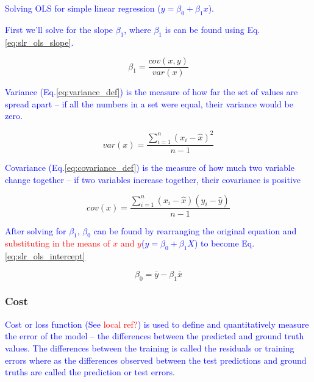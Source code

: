 \textcolor{blue}{Solving OLS for simple linear regression ($y=\beta_0 + \beta_1 x$).}

\textcolor{blue}{First we'll solve for the slope $\beta_1$, where $\beta_1$ is can be found using Eq.\ref{eq:slr_ols_slope}.}

\begin{equation}
{\beta_1 =  \frac{cov(x,y)}{var(x)}}
\label{eq:slr_ols_slope}
\end{equation}


\textcolor{blue}{Variance (Eq.\ref{eq:variance_def}) is the measure of how far the set of values are spread apart -- if all the numbers in a set were equal, their variance would be zero.}

\begin{equation}
{var(x) = \frac{\sum_{i=1}^{n}(x_i - \hat{x})^2}{n-1}}
\label{eq:variance_def}
\end{equation}


\textcolor{blue}{Covariance (Eq.\ref{eq:covariance_def}) is the measure of how much two variable change together -- if two variables increase together, their covariance is positive}

\begin{equation}
{cov(x) = \frac{\sum_{i=1}^{n}(x_i - \hat{x})(y_i - \hat{y})}{n-1}}
\label{eq:covariance_def}
\end{equation}

\textcolor{blue}{After solving for $\beta_1$, $\beta_0$ can be found by rearranging the original equation and \textcolor{red}{substituting in the means of $x$ and $y$}($y=\beta_0 + \beta_1 X$) to become Eq.\ref{eq:slr_ols_intercept}}

\begin{equation}
{\beta_0 =  \bar{y} - \beta_1 \bar{x}}
\label{eq:slr_ols_intercept}
\end{equation}

\subsubsection{Cost}

\textcolor{blue}{Cost or loss function (See \textcolor{red}{local ref?}) is used to define and quantitatively measure the error of the model -- the differences between the predicted and ground truth values. The differences between the training is called the residuals or training errors where as the differences observed between the test predictions and ground truths are called the prediction or test errors.}

